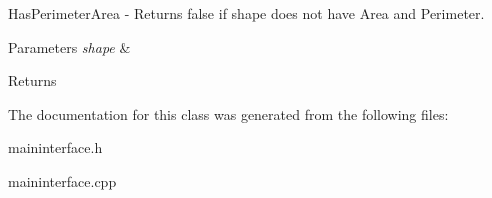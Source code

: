 Has\+Perimeter\+Area -\/ Returns false if shape does not have Area and Perimeter. 


\begin{DoxyParams}{Parameters}
{\em shape} & \\
\hline
\end{DoxyParams}
\begin{DoxyReturn}{Returns}

\end{DoxyReturn}


The documentation for this class was generated from the following files\+:\begin{DoxyCompactItemize}
\item 
maininterface.\+h\item 
maininterface.\+cpp\end{DoxyCompactItemize}
